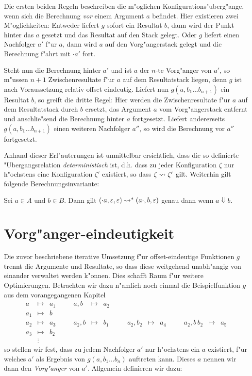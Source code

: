 \documentclass[12pt,a4paper]{article}
\begin{document}
Die ersten beiden Regeln beschreiben die m"oglichen Konfigurations"uberg"ange, wenn sich die Berechnung
\emph{vor} einem Argument $a$ befindet. Hier existieren zwei M"oglichkeiten: Entweder liefert $g$ sofort
ein Resultat $b$, dann wird der Punkt hinter das $a$ gesetzt und das Resultat auf den Stack gelegt. Oder
$g$ liefert einen Nachfolger $a'$ f"ur $a$, dann wird $a$ auf den Vorg"angerstack gelegt und die Berechnung
f"ahrt mit $\cdot a'$ fort.

Steht nun die Berechnung hinter $a'$ und ist $a$ der $n$-te Vorg"anger von $a'$, so m"ussen $n+1$
Zwischenresultate f"ur $a$ auf dem Resultatstack liegen, denn $g$ ist nach Voraussetzung relativ
offset-eindeutig. Liefert nun $g(a,b_1 \ldots b_{n+1})$ ein Resultat $b$, so greift die dritte
Regel: Hier werden die Zwischenresultate f"ur $a$ auf dem Resultatstack durch $b$ ersetzt, das
Argument $a$ vom Vorg"angerstack entfernt und anschlie"send die Berechnung hinter $a$ fortgesetzt.
Liefert andererseits $g(a,b_1 \ldots b_{n+1})$ einen weiteren Nachfolger $a''$, so wird die Berechnung
vor $a''$ fortgesetzt.

Anhand dieser Erl"auterungen ist unmittelbar ersichtlich, dass die so definierte "Ubergangsrelation
\emph{deterministisch} ist, d.h. dass zu jeder Konfiguration $\zeta$ nur h"ochstens eine Konfiguration
$\zeta'$ existiert, so dass $\zeta \rightsquigarrow \zeta'$ gilt. Weiterhin gilt folgende Berechnungsinvariante:
\begin{lemma}
  Sei $a \in A$ und $b \in B$. Dann gilt
  $(\cdot a,\varepsilon,\varepsilon) \rightsquigarrow^* (a \cdot, b, \varepsilon)$
  genau dann wenn $a \Downarrow b$.
\end{lemma}


\section{Vorg"anger-eindeutigkeit}

Die zuvor beschriebene iterative Umsetzung f"ur offset-eindeutige Funktionen $g$ trennt die Argumente
und Resultate, so dass diese weitgehend unabh"angig von einander verwaltet werden k"onnen. Dies schafft
Raum f"ur weitere Optimierungen. Betrachten wir dazu n"amlich noch einmal die Beispielfunktion $g$ aus
dem vorangegangenen Kapitel
\[\begin{array}{lclclclclcllclc}
  a &\mapsto& a_1 &\quad& a,b &\mapsto& a_2 &\quad& && &\quad& \\
  a_1 &\mapsto& b \\
  a_2 &\mapsto& a_3 && a_2,b &\mapsto& b_1 && a_2,b_2 &\mapsto& a_4 && a_2,b\,b_2 &\mapsto& a_5 \\
  a_3 &\mapsto& b_2 \\
  &\vdots&
\end{array}\]
so stellen wir fest, dass zu jedem Nachfolger $a'$ nur h"ochstens ein $a$ existiert, f"ur welches
$a'$ als Ergebnis von $g(a,b_1 \ldots b_n)$ auftreten kann. Dieses $a$ nennen wir dann den
\emph{Vorg"anger} von $a'$. Allgemein definieren wir dazu:
\end{document}
